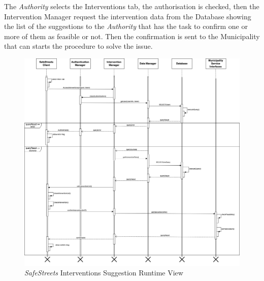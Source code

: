\documentclass{article}
\begin{document}
	The {\it Authority} selects the Interventions tab, the authorisation is checked, then the Intervention Manager request the intervention data from the Database showing the list of the suggestions to the {\it Authority} that has the task to confirm one or more of them as feasible or not. Then the confirmation is sent to the Municipality that can starts the procedure to solve the issue.  
	\begin{figure}[H]
			\centering
			\includegraphics[scale=0.30]{Images/Diagrams/Runtime/interventions_runtime.png}
			\caption{{\it SafeStreets} Interventions Suggestion Runtime View}
	\end{figure}
	\pagebreak
	\noindent
\end{document}
